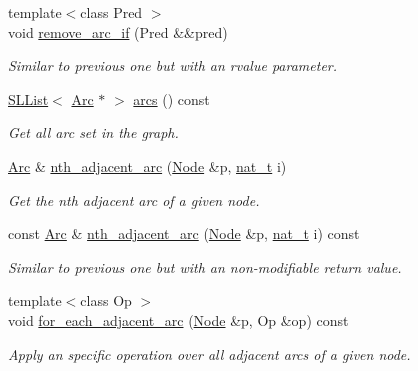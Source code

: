 \begin{DoxyCompactItemize}
{\footnotesize template$<$class Pred $>$ }\\void \hyperlink{class_designar_1_1_base_graph_a0e516bee6e0247de6bdd207de57caad6}{remove\+\_\+arc\+\_\+if} (Pred \&\&pred)
\begin{DoxyCompactList}\small\item\em Similar to previous one but with an rvalue parameter. \end{DoxyCompactList}\item 
\hyperlink{class_designar_1_1_s_l_list}{S\+L\+List}$<$ \hyperlink{namespace_designar_a3f55fb5513d62ff47cbc8f72b8e95d6f}{Arc} $\ast$ $>$ \hyperlink{class_designar_1_1_base_graph_afeff075f6386a31a06a8211e5d11fe1a}{arcs} () const
\begin{DoxyCompactList}\small\item\em Get all arc set in the graph. \end{DoxyCompactList}\item 
\hyperlink{namespace_designar_a3f55fb5513d62ff47cbc8f72b8e95d6f}{Arc} \& \hyperlink{class_designar_1_1_base_graph_a91c96135db95b2021510b769aedef850}{nth\+\_\+adjacent\+\_\+arc} (\hyperlink{namespace_designar_a5af326c65aa2bd26b26c410f2030d09e}{Node} \&p, \hyperlink{namespace_designar_aa72662848b9f4815e7bf31a7cf3e33d1}{nat\+\_\+t} i)
\begin{DoxyCompactList}\small\item\em Get the nth adjacent arc of a given node. \end{DoxyCompactList}\item 
const \hyperlink{namespace_designar_a3f55fb5513d62ff47cbc8f72b8e95d6f}{Arc} \& \hyperlink{class_designar_1_1_base_graph_a53b69f16a427a993ca2ce8bc3a5a5028}{nth\+\_\+adjacent\+\_\+arc} (\hyperlink{namespace_designar_a5af326c65aa2bd26b26c410f2030d09e}{Node} \&p, \hyperlink{namespace_designar_aa72662848b9f4815e7bf31a7cf3e33d1}{nat\+\_\+t} i) const
\begin{DoxyCompactList}\small\item\em Similar to previous one but with an non-\/modifiable return value. \end{DoxyCompactList}\item 
{\footnotesize template$<$class Op $>$ }\\void \hyperlink{class_designar_1_1_base_graph_a5e35c97bdf055f67e744f7d961ccb6a9}{for\+\_\+each\+\_\+adjacent\+\_\+arc} (\hyperlink{namespace_designar_a5af326c65aa2bd26b26c410f2030d09e}{Node} \&p, Op \&op) const
\begin{DoxyCompactList}\small\item\em Apply an specific operation over all adjacent arcs of a given node. \end{DoxyCompactList}\item 

\end{DoxyCompactItemize}
